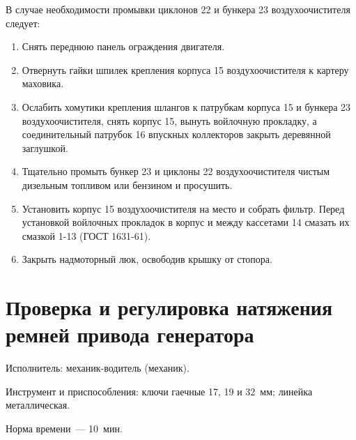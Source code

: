 В случае необходимости промывки циклонов 22 и бункера 23 воздухоочистителя следует: 
\begin{enumerate}
    \item Снять переднюю панель ограждения двигателя. 
    \item Отвернуть гайки шпилек крепления корпуса 15 воздухоочистителя к картеру маховика. 
    \item Ослабить хомутики крепления шлангов к патрубкам корпуса 15 и бункера 23 воздухоочистителя, снять корпус 15, вынуть войлочную прокладку, а соединительный патрубок 16 впускных коллекторов закрыть деревянной заглушкой. 
    \item Тщательно промыть бункер 23 и циклоны 22 воздухоочистителя чистым дизельным топливом или бензином и просушить. 
    \item Установить корпус 15 воздухоочистителя на место и собрать фильтр. Перед установкой войлочных прокладок в корпус и между кассетами 14 смазать их смазкой 1-13 (ГОСТ 1631-61). 
    \item Закрыть надмоторный люк, освободив крышку от стопора. 
\end{enumerate}


\section{Проверка и регулировка натяжения ремней привода генератора}

Исполнитель: механик-водитель (механик). 

Инструмент и приспособления: ключи гаечные 17, 19 и 32~мм; линейка металлическая. 

Норма времени~--- 10~мин. 


